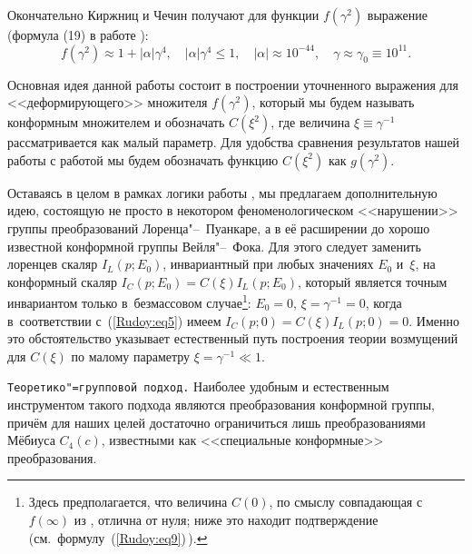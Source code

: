 Окончательно Киржниц и Чечин \cite{Rudoy:KIRSHNIZ} получают для функции $f(\gamma^2)$ выражение (формула (19) в работе  \cite{Rudoy:KIRSHNIZ}):
\begin{equation}
f(\gamma^2)\approx1+|\alpha|\gamma^4, \quad |\alpha|\gamma^4\leq1, \quad |\alpha|\approx10^{-44}, \quad
\gamma\approx\gamma_0\equiv10^{11}. \label{Rudoy:eq6}
\end{equation}

Основная идея данной работы состоит в построении уточненного выражения для <<деформирующего>> множителя $f(\gamma^2)$, который мы
будем называть конформным множителем и обозначать $C(\xi^2)$, где величина $\xi\equiv\gamma^{-1}$ рассматривается как малый
параметр. Для удобства сравнения результатов нашей работы с работой \cite{Rudoy:KIRSHNIZ} мы будем обозначать функцию $C(\xi^2)$
как $g(\gamma^2)$.

Оставаясь в целом в рамках логики работы \cite{Rudoy:KIRSHNIZ}, мы предлагаем дополнительную идею, состоящую не просто в
некотором феноменологическом <<нарушении>> группы преобразований Лоренца"--~Пуанкаре, а в её расширении до хорошо известной
конформной группы Вейля"--~Фока. Для этого следует заменить лоренцев скаляр $I_L(p;E_0)$, инвариантный при любых значениях $E_0$ и~$\xi$, на конформный скаляр $I_C(p;E_0)=C(\xi)I_L(p;E_0)$, который является точным инвариантом только в~безмассовом случае\footnote{Здесь предполагается, что величина $C(0)$, по смыслу совпадающая с  $f(\infty)$ из \cite{Rudoy:KIRSHNIZ}, отлична от нуля; ниже это находит подтверждение (см.~формулу~(\ref{Rudoy:eq9})\,).}\!\!: $E_0=0$, $\xi=\gamma^{-1}=0$, когда в~соответствии с~(\ref{Rudoy:eq5})
имеем $I_C(p;0)=C(\xi)I_L(p;0)=0$.
Именно это обстоятельство указывает естественный путь построения теории возмущений для
$C(\xi)$ по малому параметру $\xi=\gamma^{-1}\ll1$.

\smallskip

{\tt Теоретико"=групповой  подход.} Наиболее удобным и естественным инструментом такого подхода являются преобразования
конформной группы,  причём для наших целей достаточно ограничиться лишь преобразованиями Мёбиуса $C_4(c)$, известными как
<<специальные конформные>> преобразования.

